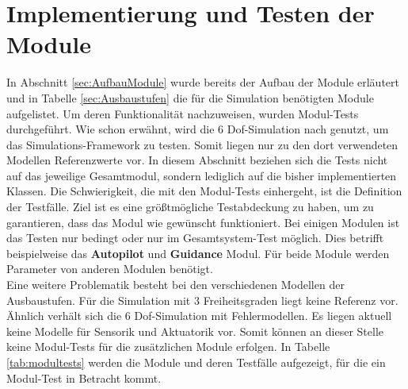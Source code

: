 \section{Implementierung und Testen der Module}
In Abschnitt \ref{sec:AufbauModule} wurde bereits der Aufbau der Module erläutert und in Tabelle \ref{sec:Ausbaustufen} die für die Simulation benötigten Module aufgelistet. Um deren Funktionalität nachzuweisen, wurden Modul-Tests durchgeführt. Wie schon erwähnt, wird die 6 Dof-Simulation nach \cite{Olucak.15.02.2017} genutzt, um das Simulations-Framework zu testen. Somit liegen nur zu den dort verwendeten Modellen Referenzwerte vor. In diesem Abschnitt beziehen sich die Tests nicht auf das jeweilige Gesamtmodul, sondern lediglich auf die bisher implementierten Klassen.
Die Schwierigkeit, die mit den Modul-Tests einhergeht, ist die Definition der Testfälle. Ziel ist es eine größtmögliche Testabdeckung zu haben, um zu garantieren, dass das Modul wie gewünscht funktioniert. Bei einigen Modulen ist das Testen nur bedingt oder  nur im Gesamtsystem-Test möglich. Dies betrifft beispielweise das \textbf{Autopilot} und \textbf{Guidance} Modul. Für beide Module werden Parameter von anderen Modulen benötigt. \\Eine weitere Problematik besteht bei den verschiedenen  Modellen der Ausbaustufen.  Für die Simulation mit 3 Freiheitsgraden liegt keine Referenz vor. Ähnlich verhält sich die 6 Dof-Simulation mit Fehlermodellen. Es liegen aktuell keine Modelle für Sensorik und Aktuatorik vor. Somit können an dieser Stelle keine Modul-Tests für die zusätzlichen Module erfolgen.
In Tabelle \ref{tab:modultests} werden die Module  und deren Testfälle aufgezeigt, für die ein Modul-Test in Betracht kommt.\\
